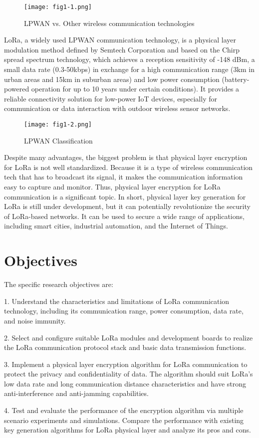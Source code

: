 \begin{figure}
  \centering
  \texttt{[image: fig1-1.png]}
  \caption{LPWAN vs. Other wireless communication technologies\cite{iotfactorylpwan}}
  \label{fig:1-1}
\end{figure}
LoRa, a widely used LPWAN communication technology, is a physical layer modulation method defined by Semtech Corporation and based on the Chirp spread spectrum technology, which achieves a reception sensitivity of -148 dBm, a small data rate (0.3-50kbps) in exchange for a high communication range (3km in urban areas and 15km in suburban areas) and low power consumption (battery-powered operation for up to 10 years under certain conditions)\cite{lorawanpara}. It provides a reliable connectivity solution for low-power IoT devices, especially for communication or data interaction with outdoor wireless sensor networks.
\begin{figure}
  \centering
  \texttt{[image: fig1-2.png]}
  \caption{LPWAN Classification}
  \label{fig:1-2}
\end{figure}
Despite many advantages, the biggest problem is that physical layer encryption for LoRa is not well standardized. Because it is a type of wireless communication tech that has to broadcast its signal, it makes the communication information easy to capture and monitor. Thus, physical layer encryption for LoRa communication is a significant topic. 
In short, physical layer key generation for LoRa is still under development, but it can potentially revolutionize the security of LoRa-based networks. It can be used to secure a wide range of applications, including smart cities, industrial automation, and the Internet of Things.

\section{Objectives}

The specific research objectives are:

1. Understand the characteristics and limitations of LoRa communication technology, including its communication range, power consumption, data rate, and noise immunity.

2. Select and configure suitable LoRa modules and development boards to realize the LoRa communication protocol stack and basic data transmission functions.

3. Implement a physical layer encryption algorithm for LoRa communication to protect the privacy and confidentiality of data. The algorithm should suit LoRa's low data rate and long communication distance characteristics and have strong anti-interference and anti-jamming capabilities.

4. Test and evaluate the performance of the encryption algorithm via multiple scenario experiments and simulations. Compare the performance with existing key generation algorithms for LoRa physical layer and analyze its pros and cons.

